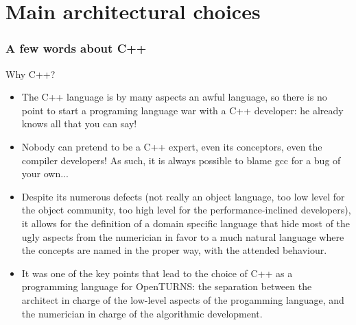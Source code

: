 \documentclass[8pt]{beamer}
\begin{document}
\section[Main architectural choices]{Main architectural choices}
\begin{frame}
  \frametitle{A few words about C++}
  \begin{block}{Why C++?}
    \begin{itemize}
    \item \alert{The C++ language is by many aspects an awful language}, so there is no point to start a programing language war with a C++ developer: he already knows all that you can say!
    \item Nobody can pretend to be a C++ expert, even its conceptors, even the compiler developers! As such, it is always possible to blame gcc for a bug of your own...
    \item Despite its numerous defects (not really an object language, too low level for the object community, too high level for the performance-inclined developers), it allows for the definition of a \alert{domain specific language} that hide most of the ugly aspects from the numerician in favor to a much natural language where the concepts are named in the proper way, with the attended behaviour.
    \item It was one of the key points that lead to the choice of C++ as a programming language for OpenTURNS: the separation between the architect in charge of the low-level aspects of the progamming language, and the numerician in charge of the algorithmic development.
    \end{itemize}
  \end{block}
\end{frame}
\end{document}
